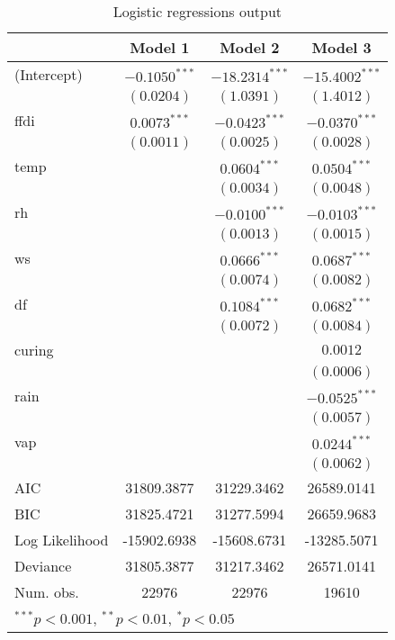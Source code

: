 \documentclass[11pt,a4paper]{article}
\begin{document}
\begin{table}
	\begin{center}
		\begin{tabular}{l c c c }
			\hline
			& Model 1 & Model 2 & Model 3 \\
		\hline
		(Intercept)    & $-0.1050^{***}$ & $-18.2314^{***}$ & $-15.4002^{***}$ \\
		& $(0.0204)$      & $(1.0391)$       & $(1.4012)$       \\
		ffdi           & $0.0073^{***}$  & $-0.0423^{***}$  & $-0.0370^{***}$  \\
		& $(0.0011)$      & $(0.0025)$       & $(0.0028)$       \\
		temp           &                 & $0.0604^{***}$   & $0.0504^{***}$   \\
		&                 & $(0.0034)$       & $(0.0048)$       \\
		rh             &                 & $-0.0100^{***}$  & $-0.0103^{***}$  \\
		&                 & $(0.0013)$       & $(0.0015)$       \\
		ws             &                 & $0.0666^{***}$   & $0.0687^{***}$   \\
		&                 & $(0.0074)$       & $(0.0082)$       \\
		df             &                 & $0.1084^{***}$   & $0.0682^{***}$   \\
		&                 & $(0.0072)$       & $(0.0084)$       \\
		curing         &                 &                  & $0.0012$         \\
		&                 &                  & $(0.0006)$       \\
		rain           &                 &                  & $-0.0525^{***}$  \\
		&                 &                  & $(0.0057)$       \\
		vap            &                 &                  & $0.0244^{***}$   \\
		&                 &                  & $(0.0062)$       \\
		\hline
		AIC            & 31809.3877      & 31229.3462       & 26589.0141       \\
		BIC            & 31825.4721      & 31277.5994       & 26659.9683       \\
		Log Likelihood & -15902.6938     & -15608.6731      & -13285.5071      \\
		Deviance       & 31805.3877      & 31217.3462       & 26571.0141       \\
		Num. obs.      & 22976           & 22976            & 19610            \\
		\hline
		\multicolumn{4}{l}{\scriptsize{$^{***}p<0.001$, $^{**}p<0.01$, $^*p<0.05$}}
	\end{tabular}
	\caption{Logistic regressions output}
	\label{table:coefficients}
\end{center}
\end{table}
\end{document}
